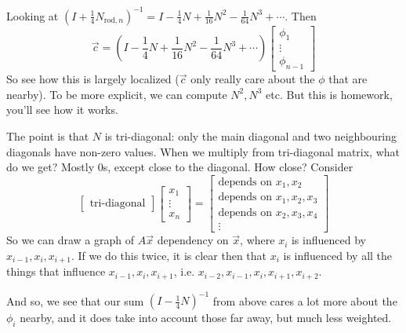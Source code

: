 \documentclass{article}
\theoremstyle{plain}
\theoremstyle{remark}
\begin{document}
Looking at $(I + \frac14 N_{\text{rod},n})^{-1}
= I - \frac14 N + \frac{1}{16} N^2 - \frac{1}{64}N^3 + \cdots$.
Then
\[
	\vec{c} = \left(I - \frac14 N + \frac{1}{16} N^2 - \frac{1}{64}N^3 + \cdots\right)
	\begin{bmatrix} \phi_1 \\ \vdots \\ \phi_{n-1} \end{bmatrix}
\]
So see how this is largely localized
($\vec{c}$ only really care about the $\phi$ that are nearby).
To be more explicit, we can compute $N^2, N^3$ etc.
But this is homework, you'll see how it works.

The point is that $N$ is tri-diagonal:
only the main diagonal and two neighbouring diagonals have non-zero values.
When we multiply from tri-diagonal matrix, what do we get?
Mostly $0$s, except close to the diagonal. How close? Consider
\[
	\begin{bmatrix} \text{tri-diagonal}\end{bmatrix}
	\begin{bmatrix} x_1 \\ \vdots \\ x_n \end{bmatrix}
	= \begin{bmatrix} \text{depends on }x_1,x_2 \\
		\text{depends on }x_1,x_2,x_3 \\
		\text{depends on }x_2,x_3,x_4 \\
		\vdots
	\end{bmatrix}
\]
So we can draw a graph of $A\vec{x}$ dependency on $\vec{x}$,
where $x_i$ is influenced by $x_{i-1},x_i,x_{i+1}$.
If we do this twice, it is clear then that $x_i$ is influenced by
all the things that influence $x_{i-1},x_i,x_{i+1}$,
i.e. $x_{i-2}, x_{i-1}, x_i, x_{i+1},x_{i+2}$.

And so, we see that our sum $(I - \frac{1}{4}N)^{-1}$
from above cares a lot more about the $\phi_i$ nearby,
and it does take into account those far away, but much less weighted.
\end{document}
